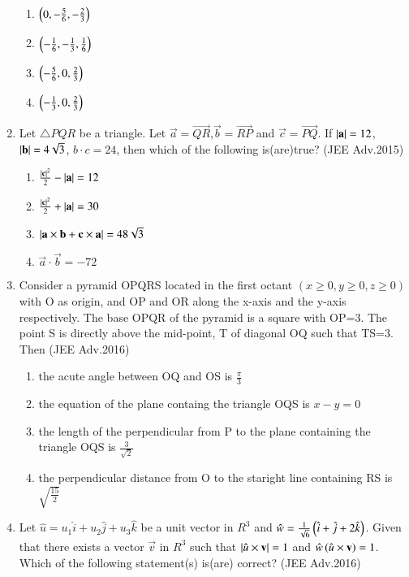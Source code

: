 \documentclass[journal]{IEEEtran}
\numberwithin{equation}{enumi}
\numberwithin{figure}{enumi}
\begin{document}
\begin{enumerate}
		\begin{enumerate}
			\item $\left(0,-\frac{5}{6},-\frac{2}{3}\right)$
			\item $\left(-\frac{1}{6},-\frac{1}{3},\frac{1}{6}\right)$
			\item $\left(-\frac{5}{6},0,\frac{2}{3}\right)$
			\item $\left(-\frac{1}{3},0,\frac{2}{3}\right)$
		\end{enumerate}
	\item Let $\triangle PQR$ be a triangle. Let $\vec{a}=\vec{QR}$,$\vec{b}=\vec{RP}$ and $\vec{c}=\vec{PQ}$. If $\left\vert\mathbf{a}\right\vert=12$, $\left\vert\mathbf{b}\right\vert=4\sqrt{3}$, $b
		\cdot c=24$, then which of the following is(are)true? \hfill{(JEE Adv.2015)}
		\begin{enumerate}
			\item $\frac{\left\vert\mathbf{c}\right\vert^2}{2}-\left\vert\mathbf{a}\right\vert=12$
			\item $\frac{\left\vert\mathbf{c}\right\vert^2}{2}+\left\vert\mathbf{a}\right\vert=30$
			\item $\left\vert\mathbf{a}\times \mathbf{b}+\mathbf{c}\times \mathbf{a}\right\vert=48\sqrt{3}$
			\item $\vec{a}\cdot\vec{b}=-72$
		\end{enumerate}
	\item Consider a pyramid OPQRS located in the first octant $(x\geq 0,y\geq 0,z\geq 0)$ with O as origin, and OP and OR along the x-axis and the y-axis respectively. The base OPQR of the pyramid is
		a square with OP=3. The point S is directly above the mid-point, T of diagonal OQ such that TS=3. Then \hfill{(JEE Adv.2016)}
		\begin{enumerate}
			\item the acute angle between OQ and OS is $\frac{\pi}{3}$
			\item the equation of the plane containg the triangle OQS is $x-y=0$
			\item the length of the perpendicular from P to the plane containing the triangle OQS is $\frac{3}{\sqrt{2}}$
			\item the perpendicular distance from O to the staright line containing RS is $\sqrt{\frac{15}{2}}$
		\end{enumerate}
	\item Let $\hat{u}=u_1\hat{i}+u_2\hat{j}+u_3\hat{k}$ be a unit vector in $R^3$ and $\hat{w}=\frac{1}{\sqrt{6}}\left(\hat{i}+\hat{j}+2\hat{k}\right)$. Given that there exists a vector $\vec{v}$ in $R^3$ 
		such that $\left\vert\hat{u} \times \mathbf{v}\right\vert=1$ and $\hat{w}\left(\hat{u}\times \mathbf{v}\right)=1$. Which of the following statement(s) is(are) correct? \hfill{(JEE Adv.2016)}

\end{enumerate}
\end{document}
